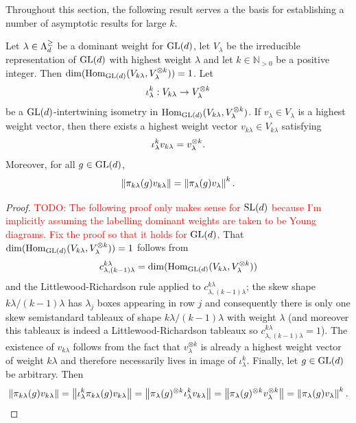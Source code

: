 \documentclass[notitlepage, 10pt]{article}
\begin{document}
Throughout this section, the following result serves a the basis for establishing a number of asymptotic results for large $k$.
\begin{lem}
    \label{lem:kth_tensor_power}
    Let $\lambda \in \Lambda^{\geq}_{d}$ be a dominant weight for $\operatorname{GL}(d)$, let $V_{\lambda}$ be the irreducible representation of $\operatorname{GL}(d)$ with highest weight $\lambda$ and let $k \in \mathbb N_{> 0}$ be a positive integer.
    Then $\dim(\operatorname{Hom}_{\operatorname{GL}(d)}(V_{k\lambda}, V_{\lambda}^{\otimes k})) = 1$.
    Let 
    \begin{equation}
        \iota_{\lambda}^{k} : V_{k\lambda} \to V_{\lambda}^{\otimes k}
    \end{equation}
    be a $\operatorname{GL}(d)$-intertwining isometry in $\operatorname{Hom}_{\operatorname{GL}(d)}(V_{k\lambda}, V_{\lambda}^{\otimes k})$.
    If $v_{\lambda} \in V_{\lambda}$ is a highest weight vector, then there exists a highest weight vector $v_{k \lambda} \in V_{k\lambda}$ satisfying
    \begin{equation}
        \iota_{\lambda}^{k} v_{k\lambda} = v_{\lambda}^{\otimes k}.
    \end{equation}
    Moreover, for all $g \in \operatorname{GL}(d)$,
    \begin{equation}
        \left\lVert\pi_{k\lambda}(g) v_{k\lambda}\right\rVert = \left\lVert\pi_{\lambda}(g) v_{\lambda}\right\rVert^{k}.
    \end{equation}
\end{lem}
\begin{proof}
    \textcolor{red}{TODO: The following proof only makes sense for $\operatorname{SL}(d)$ because I'm implicitly assuming the labelling dominant weights are taken to be Young diagrams. Fix the proof so that it holds for $\operatorname{GL}(d)$.}
    That $\dim(\operatorname{Hom}_{\operatorname{GL}(d)}(V_{k\lambda}, V_{\lambda}^{\otimes k})) = 1$ follows from
    \begin{equation}
        c^{k\lambda}_{\lambda, (k-1)\lambda} = \dim(\operatorname{Hom}_{\operatorname{GL}(d)}(V_{k\lambda}, V_{\lambda}^{\otimes k}))
    \end{equation}
    and the Littlewood-Richardson rule applied to $c^{k\lambda}_{\lambda, (k-1)\lambda}$; the skew shape $k\lambda/(k-1)\lambda$ has $\lambda_j$ boxes appearing in row $j$ and consequently there is only one skew semistandard tableaux of shape $k\lambda/(k-1)\lambda$ with weight $\lambda$ (and moreover this tableaux is indeed a Littlewood-Richardson tableaux so $c^{k\lambda}_{\lambda, (k-1)\lambda} = 1$).
    The existence of $v_{k\lambda}$ follows from the fact that $v_{\lambda}^{\otimes k}$ is already a highest weight vector of weight $k \lambda$ and therefore necessarily lives in image of $\iota_{\lambda}^{k}$.
    Finally, let $g \in \operatorname{GL}(d)$ be arbitrary.
    Then
    \begin{equation}
        \left\lVert\pi_{k\lambda}(g) v_{k\lambda}\right\rVert = \left\lVert\iota_{\lambda}^{k} \pi_{k\lambda}(g) v_{k\lambda}\right\rVert = \left\lVert\pi_{\lambda}(g)^{\otimes k} \iota_{\lambda}^{k} v_{k\lambda}\right\rVert = \left\lVert\pi_{\lambda}(g)^{\otimes k} v_{\lambda}^{\otimes k}\right\rVert = \left\lVert\pi_{\lambda}(g) v_{\lambda}\right\rVert^{k}.
    \end{equation}
\end{proof}
\end{document}
